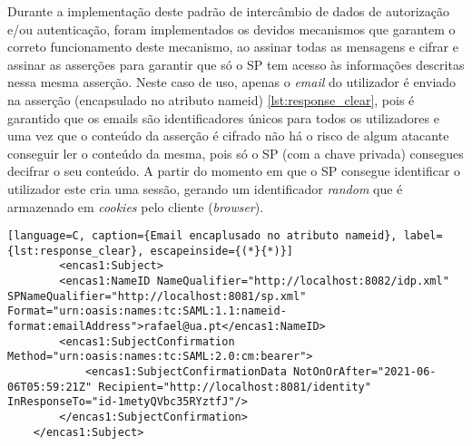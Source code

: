\quad Durante a implementação deste padrão de intercâmbio de dados de autorização e/ou autenticação, foram implementados os devidos mecanismos que garantem o correto funcionamento deste mecanismo, ao assinar todas as mensagens e cifrar e assinar as asserções para garantir que só o SP tem acesso às informações descritas nessa mesma asserção. Neste caso de uso, apenas o \textit{email} do utilizador é enviado na asserção (encapsulado no atributo nameid) \ref{lst:response_clear}, pois é garantido que os emails são identificadores únicos para todos os utilizadores e uma vez que o conteúdo da asserção é cifrado não há o risco de algum atacante conseguir ler o conteúdo da mesma, pois só o SP (com a chave privada) consegues decifrar o seu conteúdo. A partir do momento em que o SP consegue identificar o utilizador este cria uma sessão, gerando um identificador \textit{random} que é armazenado em \textit{cookies} pelo cliente (\textit{browser}).


\begin{minipage}{\linewidth}
    \begin{lstlisting}[language=C, caption={Email encaplusado no atributo nameid}, label={lst:response_clear}, escapeinside={(*}{*)}]
        <encas1:Subject>
        <encas1:NameID NameQualifier="http://localhost:8082/idp.xml" SPNameQualifier="http://localhost:8081/sp.xml" Format="urn:oasis:names:tc:SAML:1.1:nameid-format:emailAddress">rafael@ua.pt</encas1:NameID>
        <encas1:SubjectConfirmation Method="urn:oasis:names:tc:SAML:2.0:cm:bearer">
            <encas1:SubjectConfirmationData NotOnOrAfter="2021-06-06T05:59:21Z" Recipient="http://localhost:8081/identity" InResponseTo="id-1metyQVbc35RYztfJ"/>
        </encas1:SubjectConfirmation>
    </encas1:Subject>
    
    \end{lstlisting}
\end{minipage}